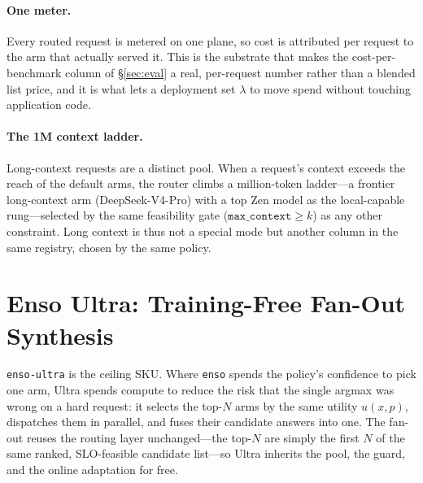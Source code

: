 \documentclass[11pt]{article}
\begin{document}
\paragraph{One meter.} Every routed request is metered on one plane, so cost is
attributed per request to the arm that actually served it. This is the substrate
that makes the cost-per-benchmark column of \S\ref{sec:eval} a real, per-request
number rather than a blended list price, and it is what lets a deployment set
$\lambda$ to move spend without touching application code.

\paragraph{The 1M context ladder.} Long-context requests are a distinct pool. When
a request's context exceeds the reach of the default arms, the router climbs a
million-token ladder---a frontier long-context arm (DeepSeek-V4-Pro) with a top Zen
model as the local-capable rung---selected by the same feasibility gate
($\texttt{max\_context}\ge k$) as any other constraint. Long context is thus not a
special mode but another column in the same registry, chosen by the same policy.

\section{Enso Ultra: Training-Free Fan-Out Synthesis}
\label{sec:ultra}

\texttt{enso-ultra} is the ceiling SKU. Where \texttt{enso} spends the policy's
confidence to pick one arm, Ultra spends compute to reduce the risk that the single
argmax was wrong on a hard request: it selects the top-$N$ arms by the same utility
$u(x,p)$, dispatches them in parallel, and fuses their candidate answers into one.
The fan-out reuses the routing layer unchanged---the top-$N$ are simply the first
$N$ of the same ranked, SLO-feasible candidate list---so Ultra inherits the pool,
the guard, and the online adaptation for free.
\end{document}
